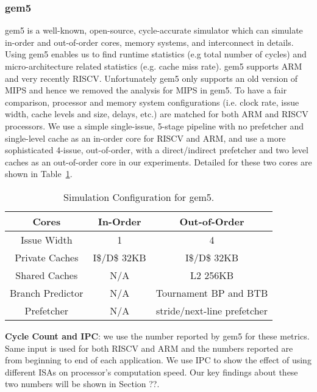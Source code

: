 \subsubsection{gem5}
gem5 is a well-known, open-source, cycle-accurate simulator which can simulate in-order and out-of-order cores, memory systems, and interconnect in details. Using gem5 enables us to find runtime statistics (e.g total number of cycles) and micro-architecture related statistics (e.g. cache miss rate). gem5 supports ARM and very recently RISCV. Unfortunately gem5 only supports an old version of MIPS and hence we removed the analysis for MIPS in gem5. To have a fair comparison, processor and memory system configurations (i.e. clock rate, issue width, cache levels and size, delays, etc.) are matched for both ARM and RISCV processors. We use a simple single-issue, 5-stage pipeline with no prefetcher and single-level cache as an in-order core for RISCV and ARM, and use a more sophisticated 4-issue, out-of-order, with a direct/indirect prefetcher and two level caches as an out-of-order core in our experiments. Detailed for these two cores are shown in Table~\ref{t:config}.

\begin{table}[h]
\caption{Simulation Configuration for gem5.}
\begin{tabular}{|c|c|c|}
\hline
\small Cores &\small In-Order &\small Out-of-Order \\
\hline
\small Issue Width & \small 1 & \small 4 \\
\hline
\small Private Caches & \small I\$/D\$ 32KB & \small I\$/D\$ 32KB\\
\hline
\small Shared Caches & \small N/A & \small L2 256KB \\
\hline
\small Branch Predictor & \small N/A & \small Tournament BP and BTB \\
\hline
\small Prefetcher & \small N/A & \small stride/next-line prefetcher \\
\hline
\end{tabular}
\label{t:config}
\end{table}

\noindent \textbf{Cycle Count and IPC}: we use the number reported by gem5 for these metrics. Same input is used for both RISCV and ARM and the numbers reported are from beginning to end of each application. We use IPC to show the effect of using different ISAs on processor's computation speed. Our key findings about these two numbers will be shown in Section ??. 

